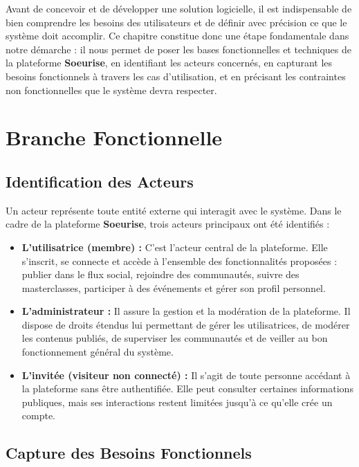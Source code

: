 \documentclass[12pt,a4paper]{report}
\begin{document}
	Avant de concevoir et de développer une solution logicielle, il est indispensable 
	de bien comprendre les besoins des utilisateurs et de définir avec précision ce que 
	le système doit accomplir. Ce chapitre constitue donc une étape fondamentale dans 
	notre démarche : il nous permet de poser les bases fonctionnelles et techniques de 
	la plateforme \textbf{Soeurise}, en identifiant les acteurs concernés, en capturant 
	les besoins fonctionnels à travers les cas d'utilisation, et en précisant les 
	contraintes non fonctionnelles que le système devra respecter.
	
	\section{Branche Fonctionnelle}
	
	\subsection{Identification des Acteurs}
	
	Un acteur représente toute entité externe qui interagit avec le système. Dans le 
	cadre de la plateforme \textbf{Soeurise}, trois acteurs principaux ont été identifiés :
	
	\begin{itemize}
		\item \textbf{L'utilisatrice (membre) :} C'est l'acteur central de la plateforme. 
		Elle s'inscrit, se connecte et accède à l'ensemble des fonctionnalités proposées : 
		publier dans le flux social, rejoindre des communautés, suivre des masterclasses, 
		participer à des événements et gérer son profil personnel.
		
		\item \textbf{L'administrateur :} Il assure la gestion et la modération de la 
		plateforme. Il dispose de droits étendus lui permettant de gérer les utilisatrices, 
		de modérer les contenus publiés, de superviser les communautés et de veiller 
		au bon fonctionnement général du système.
		
		\item \textbf{L'invitée (visiteur non connecté) :} Il s'agit de toute personne 
		accédant à la plateforme sans être authentifiée. Elle peut consulter certaines 
		informations publiques, mais ses interactions restent limitées jusqu'à ce qu'elle 
		crée un compte.
	\end{itemize}
	
	\subsection{Capture des Besoins Fonctionnels}
	
\end{document}
